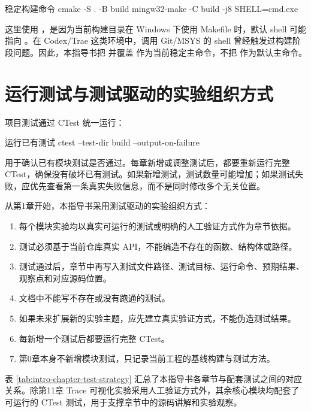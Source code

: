 \begin{dbcode}[listing options={language=bash,numbers=none}]{稳定构建命令}
cmake -S . -B build
mingw32-make -C build -j8 SHELL=cmd.exe
\end{dbcode}

这里使用 ，是因为当前构建目录在 Windows 下使用 Makefile 时，默认 shell 可能指向 。在 Codex/Trae 这类环境中，调用 Git/MSYS 的 shell 曾经触发过构建阶段问题。因此，本指导书把  并覆盖  作为当前稳定主命令，不把  作为默认主命令。

\section{运行测试与测试驱动的实验组织方式}
\label{sec:intro-test-driven}

项目测试通过 CTest 统一运行：

\begin{dbcode}[listing options={language=bash,numbers=none}]{运行已有测试}
ctest --test-dir build --output-on-failure
\end{dbcode}

 用于确认已有模块测试是否通过。每章新增或调整测试后，都要重新运行完整 CTest，确保没有破坏已有测试。如果新增测试，测试数量可能增加；如果测试失败，应优先查看第一条真实失败信息，而不是同时修改多个无关位置。

从第1章开始，本指导书采用测试驱动的实验组织方式：

\begin{enumerate}
  \item 每个模块实验均以真实可运行的测试或明确的人工验证方式作为章节依据。
  \item 测试必须基于当前仓库真实 API，不能编造不存在的函数、结构体或路径。
  \item 测试通过后，章节中再写入测试文件路径、测试目标、运行命令、预期结果、观察点和对应源码位置。
  \item 文档中不能写不存在或没有跑通的测试。
  \item 如果未来扩展新的实验主题，应先建立真实验证方式，不能伪造测试结果。
  \item 每新增一个测试后都要运行完整 CTest。
  \item 第0章本身不新增模块测试，只记录当前工程的基线构建与测试方法。
\end{enumerate}

表 \ref{tab:intro-chapter-test-strategy} 汇总了本指导书各章节与配套测试之间的对应关系。除第11章 Trace 可视化实验采用人工验证方式外，其余核心模块均配套了可运行的 CTest 测试，用于支撑章节中的源码讲解和实验观察。

